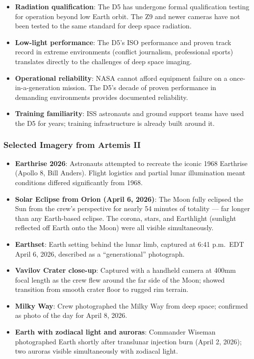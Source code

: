 \documentclass[11pt,letterpaper]{article}
\begin{document}
\begin{itemize}[leftmargin=1.5em]
  \item \textbf{Radiation qualification}: The D5 has undergone formal qualification testing for operation beyond low Earth orbit. The Z9 and newer cameras have not been tested to the same standard for deep space radiation.
  \item \textbf{Low-light performance}: The D5's ISO performance and proven track record in extreme environments (conflict journalism, professional sports) translates directly to the challenges of deep space imaging.
  \item \textbf{Operational reliability}: NASA cannot afford equipment failure on a once-in-a-generation mission. The D5's decade of proven performance in demanding environments provides documented reliability.
  \item \textbf{Training familiarity}: ISS astronauts and ground support teams have used the D5 for years; training infrastructure is already built around it.
\end{itemize}

\subsubsection{Selected Imagery from Artemis II}

\begin{itemize}[leftmargin=1.5em]
  \item \textbf{Earthrise 2026}: Astronauts attempted to recreate the iconic 1968 Earthrise (Apollo 8, Bill Anders). Flight logistics and partial lunar illumination meant conditions differed significantly from 1968.
  \item \textbf{Solar Eclipse from Orion (April 6, 2026)}: The Moon fully eclipsed the Sun from the crew's perspective for nearly 54 minutes of totality --- far longer than any Earth-based eclipse. The corona, stars, and Earthlight (sunlight reflected off Earth onto the Moon) were all visible simultaneously.
  \item \textbf{Earthset}: Earth setting behind the lunar limb, captured at 6:41 p.m.\ EDT April 6, 2026, described as a ``generational'' photograph.
  \item \textbf{Vavilov Crater close-up}: Captured with a handheld camera at 400mm focal length as the crew flew around the far side of the Moon; showed transition from smooth crater floor to rugged rim terrain.
  \item \textbf{Milky Way}: Crew photographed the Milky Way from deep space; confirmed as photo of the day for April 8, 2026.
  \item \textbf{Earth with zodiacal light and auroras}: Commander Wiseman photographed Earth shortly after translunar injection burn (April 2, 2026); two auroras visible simultaneously with zodiacal light.
\end{itemize}
\end{document}
